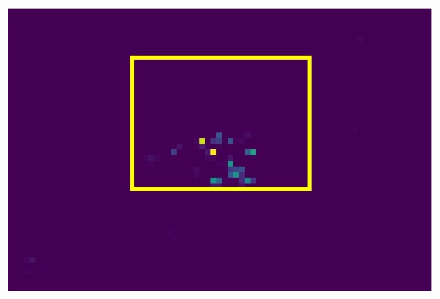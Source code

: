 \begin{figure}[h!]
{\begin{minipage}[t]{3.5cm}
		\end{minipage}
		\begin{minipage}[t]{3.5cm}
			\centering
			\includegraphics[width=0.9\linewidth]{figures/pixel/map2_3}
		\end{minipage}
		\label{fig:singlepixelmap_a}}
	

\end{figure}
